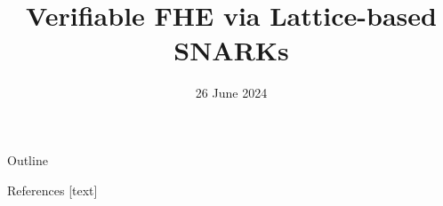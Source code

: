 \documentclass{beamer}
\title{Verifiable FHE via Lattice-based SNARKs}
\date{26 June 2024}
\begin{document}
	\begin{frame}
		\titlepage
	\end{frame}
	
	\begin{frame}{Outline}
		\tableofcontents
	\end{frame}
	
	
	
	
	
	
	\begin{frame}[allowframebreaks]{References}
		
		
		
	\end{frame}
\end{document}
